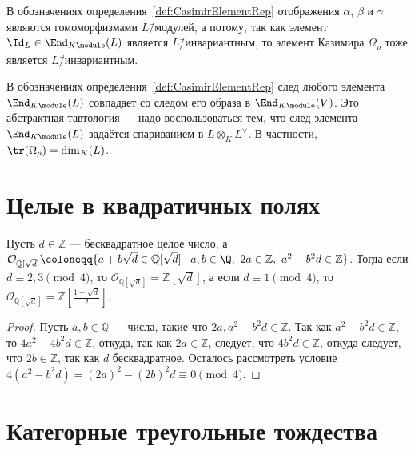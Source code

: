 \documentclass[
	extrafontsizes,
	11pt,
	hyphens,
]{memoir}
\begin{document}
\begin{observation}
В обозначениях определения~\ref{def:CasimirElementRep}
отображения \(\alpha\), \(\beta\) и \(\gamma\)
являются гомоморфизмами \(L\)\=/модулей,
а потому, так как элемент \(\Id_L \in \End_{K\module}(L)\) является \(L\)\=/инвариантным, то элемент Казимира \(\Omega_{\rho}\) тоже является \(L\)\=/инвариантным.
\end{observation}

\begin{observation}
В обозначениях определения~\ref{def:CasimirElementRep} след любого элемента \(\End_{K\module}(L)\) совпадает со следом его образа в \(\End_{K\module}(V)\).
Это абстрактная тавтология --- надо воспользоваться тем, что след элемента \(\End_{K\module}(L)\) задаётся спариванием в \(L \otimes_K L^{\vee}\).
В частности, \(\tr(\Omega_{\rho}) = \dim_K(L)\).
\end{observation}


\section{Целые в квадратичных полях}

\begin{theorem}
Пусть \(d \in \mathbb{Z}\) --- бесквадратное целое число, а
\(
\mathcal{O}_{\mathbb{Q}[\sqrt{d}]} \coloneqq \{a+b\sqrt{d} \in \mathbb{Q}[\sqrt{d}] \mid a,b \in \Q,\ 2a \in \mathbb{Z},\ a^2-{b^2}d \in \mathbb{Z} \}
\).
Тогда если \(d \equiv 2,3 \pmod{4}\), то \(\mathcal{O}_{\mathbb{Q}[\sqrt{d}]} = \mathbb{Z}[\sqrt{d}]\), а если \(d \equiv 1 \pmod{4}\), то \(\mathcal{O}_{\mathbb{Q}[\sqrt{d}]} = \mathbb{Z}[\frac{1+\sqrt{d}}{2}]\).
\end{theorem}

\begin{proof}
Пусть \(a, b \in \mathbb{Q}\) --- числа, такие что \(2a, a^2-{b^2}d \in \mathbb{Z}\).
Так как \(a^2-{b^2}d \in \mathbb{Z}\), то \(4a^2-4{b^2}d \in \mathbb{Z}\), откуда, так как \(2a \in \mathbb{Z}\), следует, что \(4{b^2}d \in \mathbb{Z}\), откуда следует, что \(2b \in \mathbb{Z}\), так как \(d\) бесквадратное.
Осталось рассмотреть условие \(4(a^2-{b^2}d) = (2a)^2 - (2b)^2 d \equiv 0 \pmod{4}\).
\end{proof}


\section{Категорные треугольные тождества}
\end{document}

